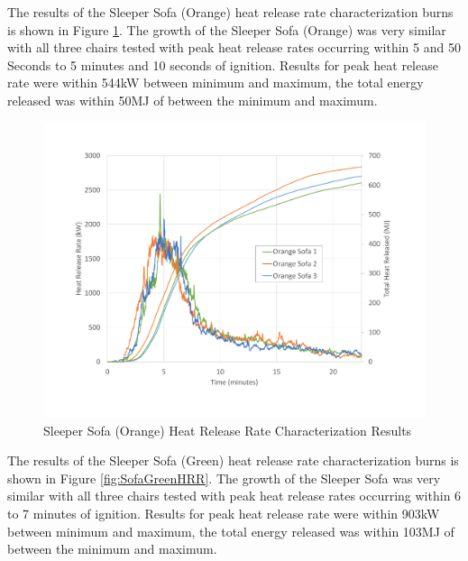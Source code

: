 \documentclass{article}
\begin{document}
The results of the Sleeper Sofa (Orange) heat release rate characterization burns is shown in Figure \ref{fig:SofaOrangeHRR}. The growth of the Sleeper Sofa (Orange) was very similar with all three chairs tested with peak heat release rates occurring within 5 and 50 Seconds to 5 minutes and 10 seconds of ignition. Results for peak heat release rate were within 544kW between minimum and maximum, the total energy released was within 50MJ of between the minimum and maximum. 

\begin{figure}[H]
	\centering
	\includegraphics[height=0.45\textheight]{0_Images/Furniture/Sofa_Orange_HRR.pdf}
	\caption{Sleeper Sofa (Orange) Heat Release Rate Characterization Results}
	\label{fig:SofaOrangeHRR}
\end{figure}

The results of the Sleeper Sofa (Green) heat release rate characterization burns is shown in Figure \ref{fig:SofaGreenHRR}. The growth of the Sleeper Sofa was very similar with all three chairs tested with peak heat release rates occurring within 6 to 7 minutes of ignition. Results for peak heat release rate were within 903kW between minimum and maximum, the total energy released was within 103MJ of between the minimum and maximum. 
\end{document}
